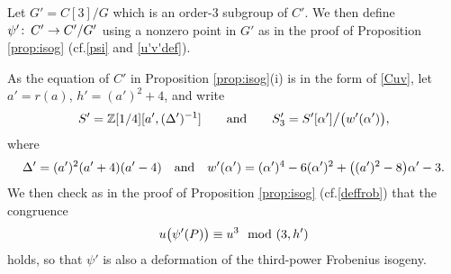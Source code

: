 \documentclass{gtpart}
\theoremstyle{definition}
\theoremstyle{remark}
\def\co{\colon\thinspace}
\newcommand{\mb}[1]{\mathbb{#1}}
\newcommand{\cf}{cf.\thinspace}
\newcommand{\BZ}{{\mb Z}}
\newcommand{\md}{~~{\rm mod}~}
\newcommand{\ad}{{\rm and}}
\newcommand{\A}{\alpha}
\begin{document}
Let $G' = C[3]/G$ which is an order-3 subgroup of $C'$.  
We then define $\psi' \co C' \to C'/G'$ using a nonzero point in $G'$ as in the proof of Proposition \ref{prop:isog} 
(\cf \eqref{psi} and \eqref{u'v'def}).  

As the equation of $C'$ in Proposition \ref{prop:isog}\thinspace (i) is in the form of \eqref{Cuv}, 
let $a' = r(a)$, $h' = (a')^2 + 4$, and write 
\begin{equation}
\label{S'}
 S' = \BZ [1/4] [a', (\Delta')^{-1}] \qquad \ad \qquad S_3' = S'[\A'] \big/ \big( w'(\A') \big), 
\end{equation}
where 
\[
 \Delta' = (a')^2 (a' + 4) (a' - 4) \quad \ad \quad w'(\A') = (\A')^4 - 6 (\A')^2 + \big( (a')^2 - 8 \big) \A' - 3.  
\]
We then check as in the proof of Proposition \ref{prop:isog} (\cf \eqref{deffrob}) that the congruence 
\[
 u\big(\psi'(P)\big) \equiv u^3 \md (3,h') 
\]
holds, so that $\psi'$ is also a deformation of the third-power Frobenius isogeny.  
\end{document}
